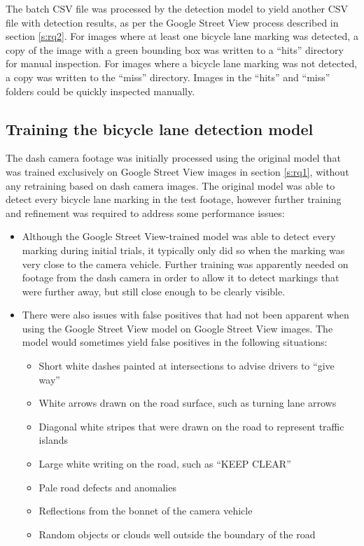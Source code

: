 \documentclass[11pt,twoside]{report}
\begin{document}
The batch CSV file was processed by the detection model to yield another CSV file with detection results, as per the Google Street View process described in section \ref{s:rq2}.  For images where at least one bicycle lane marking was detected, a copy of the image with a green bounding box was written to a ``hits'' directory for manual inspection.  For images where a bicycle lane marking was not detected, a copy was written to the ``miss'' directory.  Images in the ``hits'' and ``miss'' folders could be quickly inspected manually.


\subsection{Training the bicycle lane detection model}
\label{rq3c}

The dash camera footage was initially processed using the original model that was trained exclusively on Google Street View images in section \ref{s:rq1}, without any retraining based on dash camera images.  The original model was able to detect every bicycle lane marking in the test footage, however further training and refinement was required to address some performance issues:

\begin{itemize}
\item{Although the Google Street View-trained model was able to detect every marking during initial trials, it typically only did so when the marking was very close to the camera vehicle.  Further training was apparently needed on footage from the dash camera in order to allow it to detect markings that were further away, but still close enough to be clearly visible.}
\item{There were also issues with false positives that had not been apparent when using the Google Street View model on Google Street View images.  The model would sometimes yield false positives in the following situations:

	\begin{itemize}
	\item{Short white dashes painted at intersections to advise drivers to ``give way''}
	\item{White arrows drawn on the road surface, such as turning lane arrows}
	\item{Diagonal white stripes that were drawn on the road to represent traffic islands}
	\item{Large white writing on the road, such as ``KEEP CLEAR''}
	\item{Pale road defects and anomalies}
	\item{Reflections from the bonnet of the camera vehicle}
	\item{Random objects or clouds well outside the boundary of the road}
	\end{itemize}
}
\end{itemize}
\end{document}

